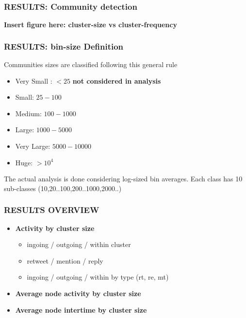 \documentclass{beamer}
\begin{document}

\begin{frame}
\frametitle{RESULTS: Community detection}
\textbf{Insert figure here: cluster-size vs cluster-frequency}
\begin{figure}
\end{figure}
\end{frame}


\begin{frame}
\frametitle{RESULTS: bin-size Definition}
Communities sizes are classified following this general rule \\
\begin{itemize}
	\item Very Small : $< 25$ \textbf{not considered in analysis}
	\item Small: $25-100$ 
	\item Medium: $100-1000$
	\item Large: $1000-5000$
	\item Very Large: $5000-10000$
	\item Huge: $>10^{4}$
\end{itemize}

The actual analysis is done considering log-sized bin averages. Each class has 10 sub-classes (10,20..100,200..1000,2000..)
\end{frame}


\begin{frame}
\frametitle{RESULTS OVERVIEW}
\begin{itemize}
	\item \textbf{Activity by cluster size}
	\begin{itemize}
		\item ingoing / outgoing / within cluster
		\item retweet / mention / reply
		\item ingoing / outgoing / within by type (rt, re, mt)
	\end{itemize}
	\item \textbf{Average node activity by cluster size}
	\item \textbf{Average node intertime by cluster size}


\end{itemize}
\end{frame}
\end{document}
